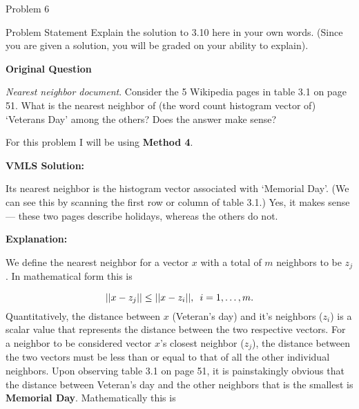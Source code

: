\begin{problem}{Problem 6}
    \begin{statement}{Problem Statement}
        Explain the solution to 3.10 here in your own words. (Since you are given a solution, you will be graded on your ability to explain). \vspace*{1em}

        \textbf{Original Question} \vspace*{1em}

        \textit{Nearest neighbor document}. Consider the 5 Wikipedia pages in table 3.1 on page 51. What is the nearest neighbor of (the word count histogram vector of) `Veterans Day' among the others?
        Does the answer make sense?
    \end{statement}

    \begin{highlight}[Solution]
        For this problem I will be using \textbf{Method 4}. \vspace*{1em}

        \textbf{VMLS Solution:} \vspace*{1em}

        Its nearest neighbor is the histogram vector associated with ‘Memorial Day’. (We can see this by scanning the first row or column of table 3.1.) Yes, it makes sense — these two pages describe 
        holidays, whereas the others do not. \vspace*{1em}

        \textbf{Explanation:} \vspace*{1em}

        We define the nearest neighbor for a vector $x$ with a total of $m$ neighbors to be $z_{j}$. In mathematical form this is

        \setcounter{equation}{0}
        \begin{equation}
            ||x - z_{j}|| \leq ||x - z_{i}||, \hspace*{5pt} i = 1,\dots,m.
        \end{equation}
        Quantitatively, the distance between $x$ (Veteran's day) and it's neighbors ($z_{i}$) is a scalar value that represents the distance between the two respective vectors. For a neighbor to be considered
        vector $x$'s closest neighbor ($z_{j}$), the distance between the two vectors must be less than or equal to that of all the other individual neighbors. Upon observing table 3.1 on page 51, it is painstakingly
        obvious that the distance between Veteran's day and the other neighbors that is the smallest is \textbf{Memorial Day}. Mathematically this is


\end{highlight}
\end{problem}
